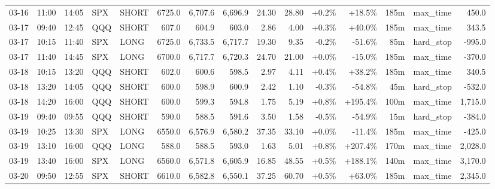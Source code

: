 \documentclass[11pt,a4paper,twoside]{article}
\begin{document}
\begin{landscape}
\begin{center}
\begin{longtable}{>{\color{txtmain}}l l l l l r r r r r r r r >{\color{txtmain}}l r}
03-16 & 11:00 & 14:05 & SPX & SHORT & 6725.0 & 6,707.6 & 6,696.9 & 24.30 & 28.80 & \textcolor{wingreen}{+0.2\%} & \textcolor{wingreen}{+18.5\%} & 185m & max\_time & \textcolor{wingreen}{450.0} \\
03-17 & 09:40 & 12:45 & QQQ & SHORT & 607.0 & 604.9 & 603.0 & 2.86 & 4.00 & \textcolor{wingreen}{+0.3\%} & \textcolor{wingreen}{+40.0\%} & 185m & max\_time & \textcolor{wingreen}{343.5} \\
03-17 & 10:15 & 11:40 & SPX & LONG & 6725.0 & 6,733.5 & 6,717.7 & 19.30 & 9.35 & \textcolor{lossred}{-0.2\%} & \textcolor{lossred}{-51.6\%} & 85m & hard\_stop & \textcolor{lossred}{-995.0} \\
03-17 & 11:40 & 14:45 & SPX & LONG & 6700.0 & 6,717.7 & 6,720.3 & 24.70 & 21.00 & \textcolor{wingreen}{+0.0\%} & \textcolor{lossred}{-15.0\%} & 185m & max\_time & \textcolor{lossred}{-370.0} \\
03-18 & 10:15 & 13:20 & QQQ & SHORT & 602.0 & 600.6 & 598.5 & 2.97 & 4.11 & \textcolor{wingreen}{+0.4\%} & \textcolor{wingreen}{+38.2\%} & 185m & max\_time & \textcolor{wingreen}{340.5} \\
03-18 & 13:20 & 14:05 & QQQ & SHORT & 600.0 & 598.9 & 600.9 & 2.42 & 1.10 & \textcolor{lossred}{-0.3\%} & \textcolor{lossred}{-54.8\%} & 45m & hard\_stop & \textcolor{lossred}{-532.0} \\
03-18 & 14:20 & 16:00 & QQQ & SHORT & 600.0 & 599.3 & 594.8 & 1.75 & 5.19 & \textcolor{wingreen}{+0.8\%} & \textcolor{wingreen}{+195.4\%} & 100m & max\_time & \textcolor{wingreen}{1,715.0} \\
03-19 & 09:40 & 09:55 & QQQ & SHORT & 590.0 & 588.5 & 591.6 & 3.50 & 1.58 & \textcolor{lossred}{-0.5\%} & \textcolor{lossred}{-54.9\%} & 15m & hard\_stop & \textcolor{lossred}{-384.0} \\
03-19 & 10:25 & 13:30 & SPX & LONG & 6550.0 & 6,576.9 & 6,580.2 & 37.35 & 33.10 & \textcolor{wingreen}{+0.0\%} & \textcolor{lossred}{-11.4\%} & 185m & max\_time & \textcolor{lossred}{-425.0} \\
03-19 & 13:10 & 16:00 & QQQ & LONG & 588.0 & 588.5 & 593.0 & 1.63 & 5.01 & \textcolor{wingreen}{+0.8\%} & \textcolor{wingreen}{+207.4\%} & 170m & max\_time & \textcolor{wingreen}{2,028.0} \\
03-19 & 13:40 & 16:00 & SPX & LONG & 6560.0 & 6,571.8 & 6,605.9 & 16.85 & 48.55 & \textcolor{wingreen}{+0.5\%} & \textcolor{wingreen}{+188.1\%} & 140m & max\_time & \textcolor{wingreen}{3,170.0} \\
03-20 & 09:50 & 12:55 & SPX & SHORT & 6610.0 & 6,582.8 & 6,550.1 & 37.25 & 60.70 & \textcolor{wingreen}{+0.5\%} & \textcolor{wingreen}{+63.0\%} & 185m & max\_time & \textcolor{wingreen}{2,345.0} \\

\end{longtable}
\end{center}
\end{landscape}
\end{document}
